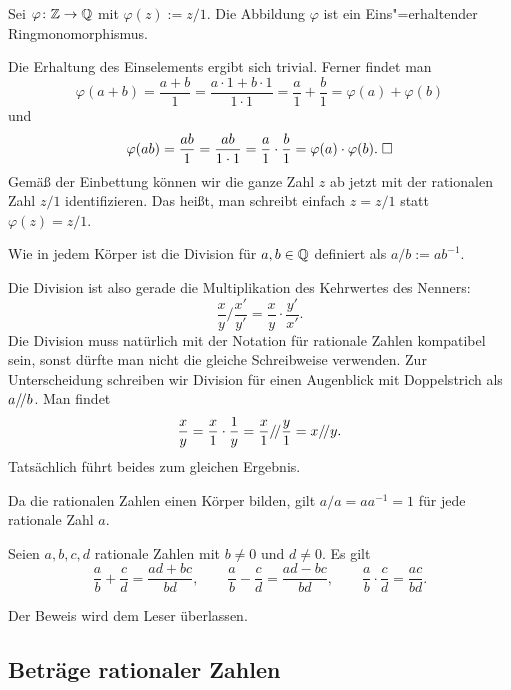 \newpage
\begin{Satz}\newlinefirst
Sei $\varphi\colon\mathbb Z\to\mathbb Q$ mit $\varphi(z):=z/1$. Die
Abbildung $\varphi$ ist ein Eins"=erhaltender Ringmonomorphismus.
\end{Satz}
 Die Erhaltung des Einselements ergibt sich
trivial. Ferner findet man
\[\varphi(a+b) = \frac{a+b}{1} = \frac{a\cdot 1+b\cdot 1}{1\cdot 1}
= \frac{a}{1}+\frac{b}{1} = \varphi(a)+\varphi(b)\]
und
\[\varphi(ab) = \frac{ab}{1} = \frac{ab}{1\cdot 1} = \frac{a}{1}\cdot\frac{b}{1}
= \varphi(a)\cdot\varphi(b).\;\Box\]
Gemäß der Einbettung können wir die ganze Zahl $z$ ab jetzt
mit der rationalen Zahl $z/1$ identifizieren. Das heißt, man schreibt
einfach $z=z/1$ statt $\varphi(z)=z/1$.

\begin{Definition}\newlinefirst
Wie in jedem Körper ist die Division für $a,b\in\mathbb Q$
definiert als $a/b := ab^{-1}$.
\end{Definition}
Die Division ist also gerade die Multiplikation des Kehrwertes
des Nenners:
\[\frac{x}{y}/\frac{x'}{y'} = \frac{x}{y}\cdot\frac{y'}{x'}.\]
Die Division muss natürlich mit der Notation für rationale Zahlen
kompatibel sein, sonst dürfte man nicht die gleiche Schreibweise
verwenden. Zur Unterscheidung schreiben wir Division für einen
Augenblick mit Doppelstrich als $a/\!/ b$. Man findet
\[\frac{x}{y} = \frac{x}{1}\cdot\frac{1}{y}
= \frac{x}{1}/\!/\frac{y}{1} = x/\!/ y.\]
Tatsächlich führt beides zum gleichen Ergebnis.

Da die rationalen Zahlen einen Körper bilden, gilt $a/a=aa^{-1}=1$
für jede rationale Zahl $a$.

\begin{Satz}\newlinefirst
Seien $a,b,c,d$ rationale Zahlen mit $b\ne 0$ und $d\ne 0$. Es gilt
\[\frac{a}{b}+\frac{c}{d} = \frac{ad+bc}{bd},
\qquad \frac{a}{b}-\frac{c}{d} = \frac{ad-bc}{bd},
\qquad \frac{a}{b}\cdot\frac{c}{d} = \frac{ac}{bd}.\]
\end{Satz}
Der Beweis wird dem Leser überlassen.

\newpage
\subsection{Beträge rationaler Zahlen}

